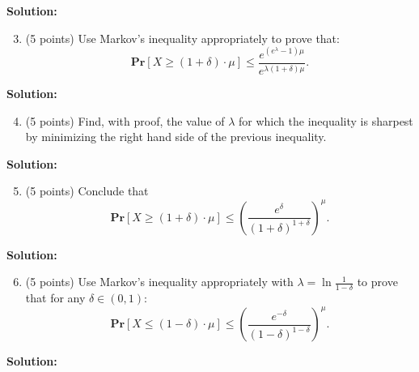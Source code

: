 \documentclass[11pt]{article}
\newcommand{\PPr}[1]{\ensuremath{\mathbf{Pr}\left[#1\right]}}
\begin{document}
\noindent\textbf{Solution:}




\begin{enumerate}
\setcounter{enumi}{2}
\item (5 points)
Use Markov's inequality appropriately to prove that:
\[\PPr{X\ge(1+\delta)\cdot\mu}\le\frac{e^{(e^\lambda-1)\mu}}{e^{\lambda(1+\delta)\mu}}.\]
\end{enumerate}

\noindent\textbf{Solution:}





\begin{enumerate}
\setcounter{enumi}{3}
\item (5 points)
Find, with proof, the value of $\lambda$ for which the inequality is sharpest by minimizing the right hand side of the previous inequality. 
\end{enumerate}

\noindent\textbf{Solution:}




\begin{enumerate}
\setcounter{enumi}{4}
\item (5 points)
Conclude that
\[\PPr{X\ge(1+\delta)\cdot\mu}\le\left(\frac{e^\delta}{(1+\delta)^{1+\delta}}\right)^\mu.\]
\end{enumerate}

\noindent\textbf{Solution:}





\begin{enumerate}
\setcounter{enumi}{5}
\item (5 points)
Use Markov's inequality appropriately with $\lambda=\ln\frac{1}{1-\delta}$ to prove that for any $\delta\in(0,1)$:
\[\PPr{X\le(1-\delta)\cdot\mu}\le\left(\frac{e^{-\delta}}{(1-\delta)^{1-\delta}}\right)^\mu.\]
\end{enumerate}

\noindent\textbf{Solution:}
\end{document}
